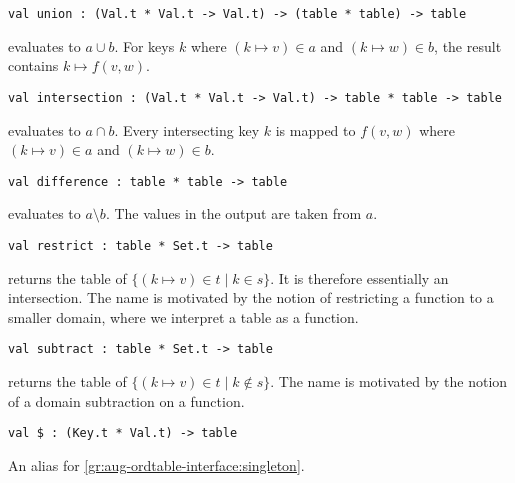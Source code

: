 \begin{gram}[union]
\begin{verbatim}
val union : (Val.t * Val.t -> Val.t) -> (table * table) -> table
\end{verbatim}
 evaluates to $a \cup b$. For keys $k$ where $(k \mapsto v) \in a$
and $(k \mapsto w) \in b$, the result contains $k \mapsto f(v,w)$.
\end{gram}

\begin{gram}[intersection]
\begin{verbatim}
val intersection : (Val.t * Val.t -> Val.t) -> table * table -> table
\end{verbatim}
 evaluates to $a \cap b$. Every intersecting key
$k$ is mapped to $f(v,w)$ where $(k \mapsto v) \in a$ and $(k \mapsto w) \in b$.
\end{gram}

\begin{gram}[difference]
\begin{verbatim}
val difference : table * table -> table
\end{verbatim}
 evaluates to $a \setminus b$. The values in the output
are taken from $a$.
\end{gram}

\begin{gram}[restrict]
\begin{verbatim}
val restrict : table * Set.t -> table
\end{verbatim}
 returns the table of $\{(k \mapsto v) \in t \mathbin| k \in s\}$.
It is therefore essentially an intersection. The name is motivated by the
notion of restricting a function to a smaller domain, where we interpret a table
as a function.
\end{gram}

\begin{gram}[subtract]
\begin{verbatim}
val subtract : table * Set.t -> table
\end{verbatim}
 returns the table of
$\{(k \mapsto v) \in t \mathbin| k \not\in s\}$.
The name is motivated by the notion of a domain subtraction on a function.
\end{gram}

\begin{gram}[\$]
\begin{verbatim}
val $ : (Key.t * Val.t) -> table
\end{verbatim}
An alias for \ref{gr:aug-ordtable-interface:singleton}.
\end{gram}

